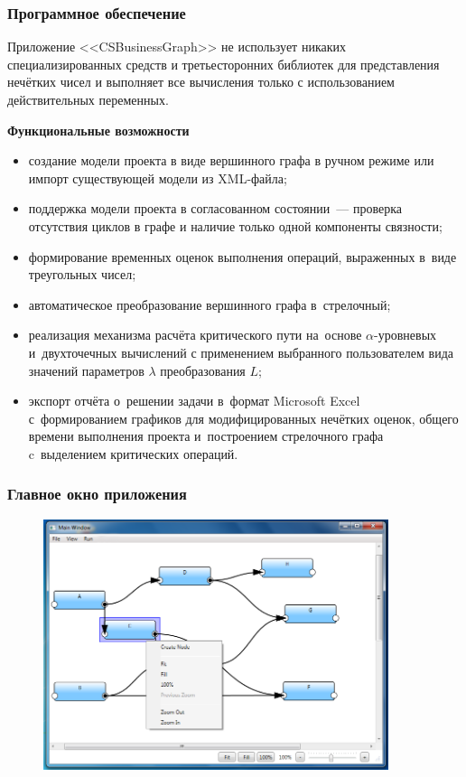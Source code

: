 \documentclass[12pt]{beamer}
\begin{document}
\begin{frame}
  \frametitle{Программное обеспечение}
  Приложение <<CSBusinessGraph>> не использует никаких специализированных средств и третьесторонних библиотек для представления нечётких чисел и выполняет все вычисления только с использованием действительных переменных.
  
  \textbf{Функциональные возможности}
  \begin{itemize}
    \item создание модели проекта в виде вершинного графа в ручном режиме или импорт существующей модели из XML-файла;
    \item поддержка модели проекта в согласованном состоянии~--- проверка отсутствия циклов в графе и наличие только одной компоненты связности;
    \item формирование временных оценок выполнения операций, выраженных в~виде треугольных чисел;
    \item автоматическое преобразование вершинного графа в~стрелочный;
    \item реализация механизма расчёта критического пути на~основе $\alpha$-уровневых и~двухточечных вычислений с применением выбранного пользователем  вида значений параметров $\lambda$ преобразования $L$;
    \item экспорт отчёта о~решении задачи в~формат Microsoft Excel с~формированием графиков для модифицированных нечётких оценок, общего времени выполнения проекта и~построением стрелочного графа c~выделением критических операций.
  \end{itemize}
\end{frame}

\begin{frame}
  \frametitle{Главное окно приложения}
  \begin{figure}
    \center
    \includegraphics[width=0.9\textwidth]{app-sample-graph.png}
  \end{figure}
\end{frame}
\end{document}
